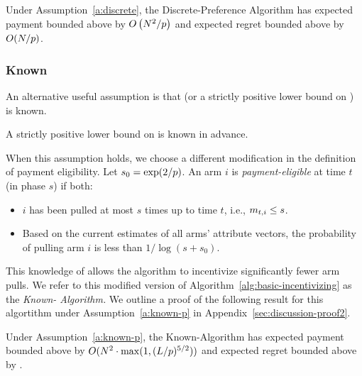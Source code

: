 \begin{theorem}
\label{rst:discrete}
Under Assumption~\ref{a:discrete}, the Discrete-Preference Algorithm
has expected payment bounded above by 
$O \left(N^2/p \right)$
and expected regret bounded above by $O(N / p)$.
\end{theorem}

\subsubsection{Known \MinProb}
An alternative useful assumption is that \MinProb
(or a strictly positive lower bound on \MinProb) is known. 

\begin{assumption}
\label{a:known-p}
A strictly positive lower bound on \MinProb is known in advance.
\end{assumption}

When this assumption holds, we choose a different modification in the
definition of payment eligibility.
Let $s_0 = \exp(2/p)$.
An arm $i$ is \emph{payment-eligible} at time $t$ (in phase $s$)
if both:
\begin{itemize}
\item $i$ has been pulled at most
$s$ times up to time $t$, i.e., $m_{t,i} \leq s$.
\item Based on the current estimates  of all arms' attribute vectors,
the probability of pulling arm $i$ is less than $1/\log(s+s_0)$.
\end{itemize}

This knowledge of \MinProb allows the algorithm to incentivize
significantly fewer arm pulls.
We refer to this modified version of
Algorithm~\ref{alg:basic-incentivizing} as the \emph{Known-\MinProb
Algorithm.}
We outline a proof of the following result for this algortithm under
Assumption~\ref{a:known-p} in Appendix~\ref{sec:discussion-proof2}.

\begin{theorem}
\label{rst:known-p}
Under Assumption~\ref{a:known-p}, the Known-\MinProb Algorithm has
expected payment  bounded above by  
$O(N^2 \cdot \max(1,(L/p)^{5/2}))$ 
and expected regret bounded above by
.
\end{theorem}


